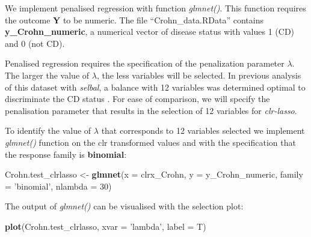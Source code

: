 \documentclass[openany]{book}
\newenvironment{Shaded}{\begin{snugshade}}{\end{snugshade}}
\newcommand{\KeywordTok}[1]{\textcolor[rgb]{0.13,0.29,0.53}{\textbf{#1}}}
\newcommand{\DataTypeTok}[1]{\textcolor[rgb]{0.13,0.29,0.53}{#1}}
\newcommand{\DecValTok}[1]{\textcolor[rgb]{0.00,0.00,0.81}{#1}}
\newcommand{\StringTok}[1]{\textcolor[rgb]{0.31,0.60,0.02}{#1}}
\newcommand{\NormalTok}[1]{#1}
\begin{document}
We implement penalised regression with function \emph{glmnet()}. This
function requires the outcome \textbf{Y} to be numeric. The file
``Crohn\_data.RData'' contains \textbf{y\_Crohn\_numeric}, a numerical
vector of disease status with values 1 (CD) and 0 (not CD).

Penalised regression requires the specification of the penalization
parameter \(\lambda\). The larger the value of \(\lambda\), the less
variables will be selected. In previous analysis of this dataset with
\emph{selbal}, a balance with 12 variables was determined optimal to
discriminate the CD status \citep{rivera2018balances}. For ease of
comparison, we will specify the penalisation parameter that results in
the selection of 12 variables for \emph{clr-lasso}.

To identify the value of \(\lambda\) that corresponds to 12 variables
selected we implement \emph{glmnet()} function on the clr transformed
values and with the specification that the response family is
\textbf{binomial}:

\begin{Shaded}
\begin{Highlighting}[]
\NormalTok{Crohn.test_clrlasso <-}\StringTok{ }\KeywordTok{glmnet}\NormalTok{(}\DataTypeTok{x =}\NormalTok{ clrx_Crohn, }\DataTypeTok{y =}\NormalTok{ y_Crohn_numeric, }
                              \DataTypeTok{family =} \StringTok{'binomial'}\NormalTok{, }\DataTypeTok{nlambda =} \DecValTok{30}\NormalTok{)}
\end{Highlighting}
\end{Shaded}

The output of \emph{glmnet()} can be visualised with the selection plot:

\begin{Shaded}
\begin{Highlighting}[]
\KeywordTok{plot}\NormalTok{(Crohn.test_clrlasso, }\DataTypeTok{xvar =} \StringTok{'lambda'}\NormalTok{, }\DataTypeTok{label =}\NormalTok{ T)}
\end{Highlighting}
\end{Shaded}
\end{document}
